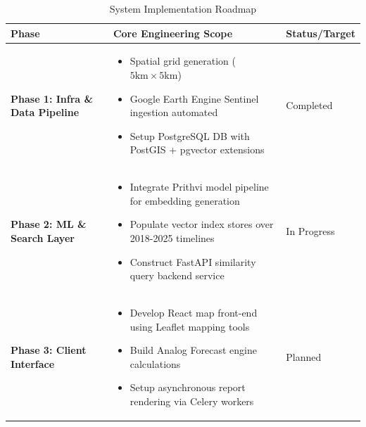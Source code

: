 \documentclass[11pt,a4paper]{article}
\begin{document}
\begin{longtable}{p{3cm}p{7cm}p{4cm}}
\caption{System Implementation Roadmap} \\
\toprule
\textbf{Phase} & \textbf{Core Engineering Scope} & \textbf{Status/Target} \\
\midrule
\endfirsthead %
\endhead
\textbf{Phase 1: Infra \& Data Pipeline} 
& \begin{itemize}[leftmargin=*]
    \item Spatial grid generation ($5\text{km} \times 5\text{km}$)
    \item Google Earth Engine Sentinel ingestion automated
    \item Setup PostgreSQL DB with PostGIS + pgvector extensions
\end{itemize} 
& Completed \\
\midrule
\textbf{Phase 2: ML \& Search Layer} 
& \begin{itemize}[leftmargin=*]
    \item Integrate Prithvi model pipeline for embedding generation
    \item Populate vector index stores over 2018-2025 timelines
    \item Construct FastAPI similarity query backend service
\end{itemize} 
& In Progress \\
\midrule
\textbf{Phase 3: Client Interface} 
& \begin{itemize}[leftmargin=*]
    \item Develop React map front-end using Leaflet mapping tools
    \item Build Analog Forecast engine calculations
    \item Setup asynchronous report rendering via Celery workers
\end{itemize} 
& Planned \\
\bottomrule
\end{longtable}

\end{document}
